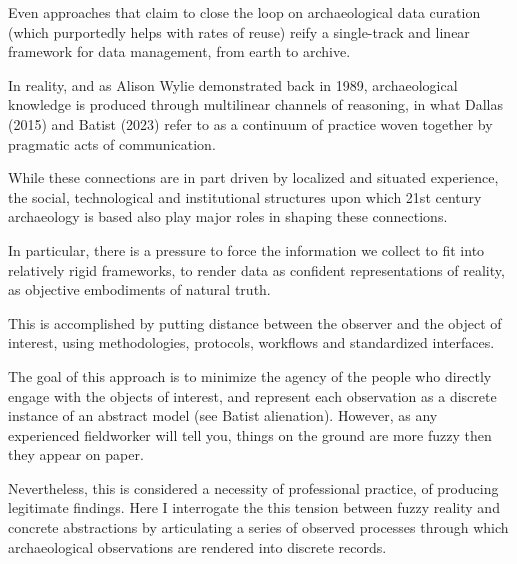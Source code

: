 
Even approaches that claim to close the loop on archaeological data curation (which purportedly helps with rates of reuse) reify a single-track and linear framework for data management, from earth to archive.

In reality, and as Alison Wylie demonstrated back in 1989, archaeological knowledge is produced through multilinear channels of reasoning, in what Dallas (2015) and Batist (2023) refer to as a continuum of practice woven together by pragmatic acts of communication.

While these connections are in part driven by localized and situated experience, the social, technological and institutional structures upon which 21st century archaeology is based also play major roles in shaping these connections.

In particular, there is a pressure to force the information we collect to fit into relatively rigid frameworks, to render data as confident representations of reality, as objective embodiments of natural truth.

This is accomplished by putting distance between the observer and the object of interest, using methodologies, protocols, workflows and standardized interfaces.

The goal of this approach is to minimize the agency of the people who directly engage with the objects of interest, and represent each observation as a discrete instance of an abstract model (see Batist alienation).
However, as any experienced fieldworker will tell you, things on the ground are more fuzzy then they appear on paper.

Nevertheless, this is considered a necessity of professional practice, of producing legitimate findings.
Here I interrogate the this tension between fuzzy reality and concrete abstractions by articulating a series of observed processes through which archaeological observations are rendered into discrete records.